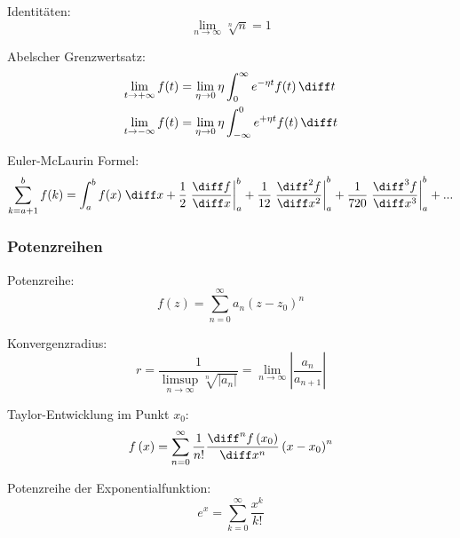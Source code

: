 \documentclass[11pt]{article}
\numberwithin{equation}{section}
\begin{document}
          Identitäten:
          \begin{equation}
            \lim_{n\rightarrow\infty} \sqrt[n]{n} = 1
          \end{equation}

          Abelscher Grenzwertsatz:
          \begin{equation}
            \begin{aligned}
              \lim_{t\rightarrow+\infty} f(t) &= \lim_{\eta\rightarrow 0} \eta \int_0^\infty e^{-\eta t} f(t) \,\diff t \\
              \lim_{t\rightarrow-\infty} f(t) &= \lim_{\eta\rightarrow 0} \eta \int_{-\infty}^{0} e^{+\eta t} f(t) \,\diff t \\
            \end{aligned}
          \end{equation}

          Euler-McLaurin Formel:
          \begin{equation}
            \sum_{k=a+1}^{b} f(k) = \int_{a}^{b}f(x) \;\diff x
            + \frac{1}{2}   \left.\frac{\diff   f}{\diff x  } \right|_{a}^{b}
            + \frac{1}{12}  \left.\frac{\diff^2 f}{\diff x^2} \right|_{a}^{b}
            + \frac{1}{720} \left.\frac{\diff^3 f}{\diff x^3} \right|_{a}^{b}
            + ...
          \end{equation}

        \subsubsection{Potenzreihen}
          Potenzreihe:
          \begin{equation}
            f(z) = \sum_{n=0}^{\infty} a_n (z-z_0)^n
          \end{equation}

          Konvergenzradius:
          \begin{equation}
            r = \frac{1}{\limsup\limits_{n\rightarrow\infty} \sqrt[n]{\left|a_n\right|}} = \lim_{n\rightarrow\infty}\left|\frac{a_n}{a_{n+1}}\right|
          \end{equation}

          Taylor-Entwicklung im Punkt $x_0$:
          \begin{equation}
            f\left(x\right)=\sum_{n=0}^{\infty}\frac{1}{n!}\frac{\diff^{n}f\left(x_0\right)}{\diff x^{n}}\left(x-x_0\right)^{n}
          \end{equation}

    			Potenzreihe der Exponentialfunktion:
    			\begin{equation}
    				e^x=\sum_{k=0}^{\infty}{\frac{x^k}{k!}}
    			\end{equation}
\end{document}
